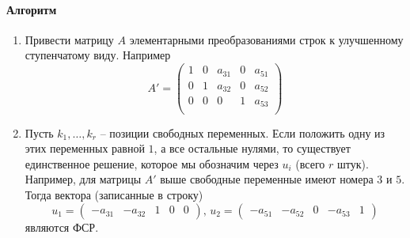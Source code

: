 \paragraph{Алгоритм}

\begin{enumerate}
\item Привести матрицу $A$ элементарными преобразованиями строк к улучшенному ступенчатому виду.
Например
\[
A' = 
\begin{pmatrix}
{1}&{0}&{a_{31}}&{0}&{a_{51}}\\
{0}&{1}&{a_{32}}&{0}&{a_{52}}\\
{0}&{0}&{0}&{1}&{a_{53}}\\
\end{pmatrix}
\]

\item Пусть $k_1,\ldots,k_r$ -- позиции свободных переменных.
Если положить одну из этих переменных равной $1$, а все остальные нулями, то существует единственное решение, которое мы обозначим через $u_i$ (всего $r$ штук).
Например, для матрицы $A'$ выше свободные переменные имеют номера $3$ и $5$.
Тогда вектора (записанные в строку)
\[
u_1 = 
\begin{pmatrix}
{-a_{31}}&{-a_{32}}&{1}&{0}&{0}
\end{pmatrix},\,
u_2 = 
\begin{pmatrix}
{-a_{51}}&{-a_{52}}&{0}&{-a_{53}}&{1}
\end{pmatrix}
\]
являются ФСР.
\end{enumerate}

